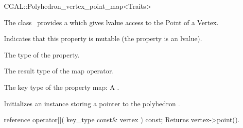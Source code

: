 

\begin{ccRefClass}{CGAL::Polyhedron_vertex_point_map<Traits>}


\ccDefinition

The class \ccRefName\ provides a   which gives lvalue access to the Point of a  Vertex.


\ccTypes
    {Indicates that this property is mutable (the property is an lvalue).}
  
    {The type of the property.}
    
    {The result type of the map operator.}
    
  {The key type of the property map: A .}

\ccCreation
{}  %

{Initializes an instance storing a pointer to the polyhedron .}

\ccOperations

\ccMethod
  {reference operator[]( key_type const& vertex ) const;}
  {Returns vertex->point().}  
    
\ccIsModel
{}

\end{ccRefClass}


